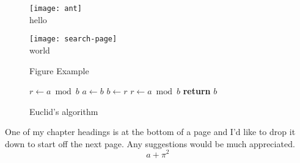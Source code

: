 \newpage

\begin{figure}
\begin{minipage}[b]{2.65in}
\begin{center}
\texttt{[image: ant]}
\\hello
\end{center}
\end{minipage}
\hspace*{.375in}
\begin{minipage}[b]{2.65in}
\begin{center}
\texttt{[image: search-page]}
\\world
\end{center}
\end{minipage}
\caption{Figure Example}
\end{figure}

\begin{figure}
\begin{algorithmic}[1]
\State $r \gets a\bmod b$
\State $a\gets b$
\State $b\gets r$
\State $r\gets a\bmod b$
\EndWhile
\State \textbf{return} $b$
\EndProcedure
\end{algorithmic}
\caption{Euclid’s algorithm}
\end{figure}


One of my chapter headings\cite{ddd} is \cite{fff} at the bottom of a page and I'd like to drop it down to start off the next page. Any suggestions would be much appreciated.
$$ a+\pi^2 \ $$

